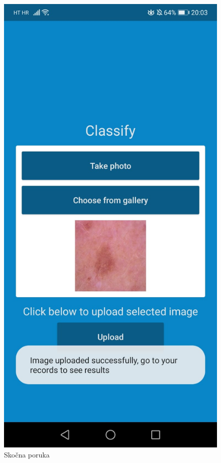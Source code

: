 \documentclass[times, utf8, zavrsni]{fer}
\begin{document}
\begin{figure}[!h]
  \includegraphics[width=1\textwidth]{./slike/app9}
	\caption{Skočna poruka}
\label{fig:app9}
\endminipage\hfill
{}

\end{figure}
\end{document}
